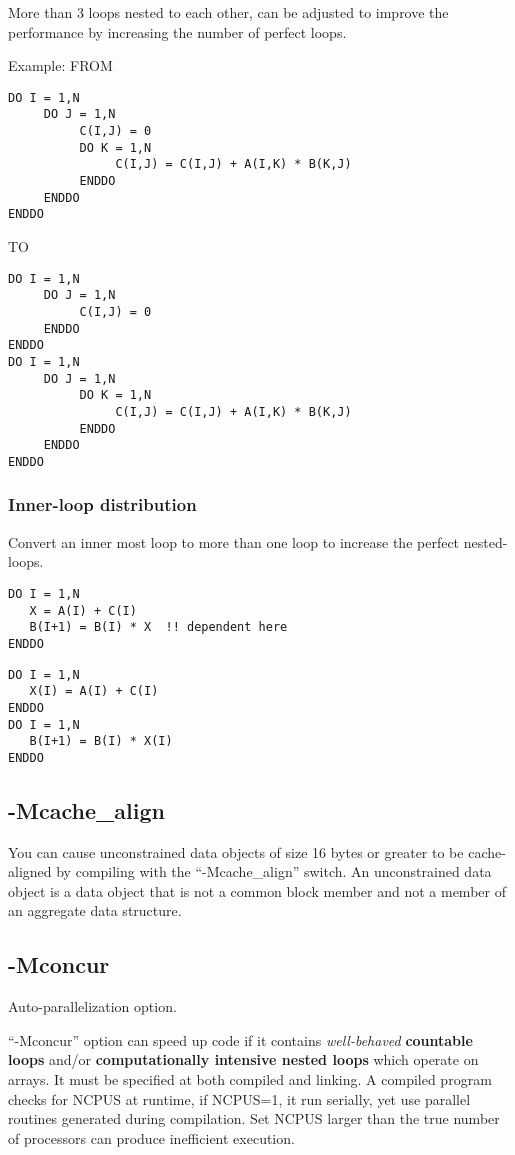 More than 3 loops nested to each other, can be adjusted to improve the
performance by increasing the number of perfect loops.


Example: FROM
\begin{lstlisting}
DO I = 1,N
     DO J = 1,N
          C(I,J) = 0
          DO K = 1,N
               C(I,J) = C(I,J) + A(I,K) * B(K,J)
          ENDDO
     ENDDO
ENDDO
\end{lstlisting}
TO
\begin{lstlisting}
DO I = 1,N
     DO J = 1,N
          C(I,J) = 0
     ENDDO
ENDDO
DO I = 1,N
     DO J = 1,N
          DO K = 1,N
               C(I,J) = C(I,J) + A(I,K) * B(K,J)
          ENDDO
     ENDDO
ENDDO
\end{lstlisting}

\subsubsection{Inner-loop distribution}
\label{sec:inner-loop-distr}

Convert an inner most loop to more than one loop to increase the
perfect nested-loops.

\begin{lstlisting}
DO I = 1,N
   X = A(I) + C(I)
   B(I+1) = B(I) * X  !! dependent here
ENDDO
\end{lstlisting}

\begin{lstlisting}
DO I = 1,N
   X(I) = A(I) + C(I)
ENDDO
DO I = 1,N
   B(I+1) = B(I) * X(I)
ENDDO
\end{lstlisting}

\subsection{-Mcache\_align}
\label{sec:-mcache_align}

You can cause unconstrained data objects of size 16 bytes or greater
to be cache-aligned by compiling with the ``-Mcache\_align'' switch. An
unconstrained data object is a data object that is not a common block
member and not a member of an aggregate data structure. 

\subsection{-Mconcur}
\label{sec:-mconcur}

Auto-parallelization option.

``-Mconcur'' option can speed up code if it contains
{\it well-behaved} {\bf countable loops} and/or
{\bf computationally intensive nested loops} which operate on arrays.
It must be specified at both compiled and linking.
A compiled program checks for NCPUS at runtime, if NCPUS=1, it run
serially, yet use parallel routines generated during compilation. Set
NCPUS larger than the true number of processors can produce
inefficient execution. 


